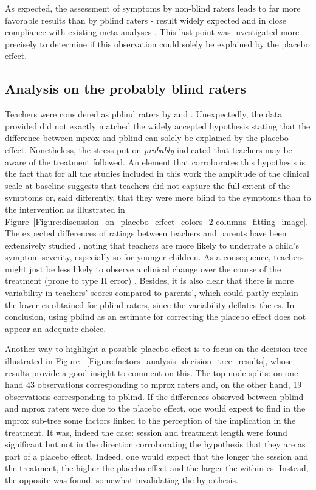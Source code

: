 As expected, the assessment of symptoms by non-blind raters leads to far more favorable results than by \gls{pblind} raters -
result widely expected and in close compliance with existing meta-analyses \citep{Cortese2016, Micoulaud2014}. This last point
was investigated more precisely to determine if this observation could solely be explained by the placebo effect. 

\subsection{Analysis on the probably blind raters}

Teachers were considered as \gls{pblind} raters by \citeauthor{Cortese2016} and \citeauthor{Micoulaud2014}.
Unexpectedly, the data provided did not exactly matched the widely accepted hypothesis stating that the difference between
\gls{mprox} and \gls{pblind} can solely be explained by the placebo effect. 
Nonetheless, the stress put on \emph{probably} indicated that teachers may be aware of the treatment followed. 
An element that corroborates this hypothesis is the fact that for all the studies included in this work the amplitude 
of the clinical scale at baseline suggests that teachers did not capture the full extent of the symptoms or, said differently, 
that they were more blind to the symptoms than to the intervention as illustrated 
in Figure~\ref{Figure:discussion_on_placebo_effect_colors_2-columns_fitting_image}. The expected differences of ratings between 
teachers and parents have been extensively studied \citep{Sollie2013, Narad2015, Minder2018}, noting that teachers are more 
likely to underrate a child's symptom severity, especially so for younger children. As a consequence, teachers might just 
be less likely to observe a clinical change over the course of the treatment (prone to type II error) 
\citep{Sollie2013, Narad2015, Minder2018}. Besides, it is also clear that there is more variability in teachers' scores compared 
to parents', which could partly explain the lower \gls{es} obtained for \gls{pblind} raters, since the variability deflates
the \gls{es}. In conclusion, using \gls{pblind} as an estimate for correcting the placebo effect does not appear 
an adequate choice. 

Another way to highlight a possible placebo effect is to focus on the decision tree illustrated in Figure
~\ref{Figure:factors_analysis_decision_tree_results}, whose results provide a good insight to comment on this.
The top node splits: on one hand 43 observations corresponding to \gls{mprox} raters and, on the other hand, 
19 observations corresponding to \gls{pblind}. If the differences observed between \gls{pblind} and \gls{mprox} raters were 
due to the placebo effect, one would expect to find in the \gls{mprox} sub-tree some factors linked to the perception
of the implication in the treatment. It was, indeed the case: session and treatment length were found significant but not in the
direction corroborating the hypothesis that they are as part of a placebo effect. Indeed, one would expect that the
longer the session and the treatment, the higher the placebo effect and the larger the within-\gls{es}. Instead, the opposite was found, 
somewhat invalidating the hypothesis. 

